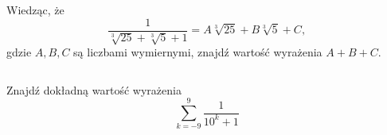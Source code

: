 $ $

\begin{zada}
Wiedząc, że 
\[\frac{1}{\sqrt[3]{25}+\sqrt[3]{5}+1} = A\sqrt[3]{25}+B\sqrt[3]{5}+C, \]
gdzie $A,B,C$ są liczbami wymiernymi, znajdź wartość wyrażenia $A+B+C$. 
\end{zada}

$ $

\begin{zada}
Znajdź dokładną wartość wyrażenia 
\[ \sum_{k=-9}^{9} \frac{1}{10^{k}+1}\]
\end{zada}

    
%
